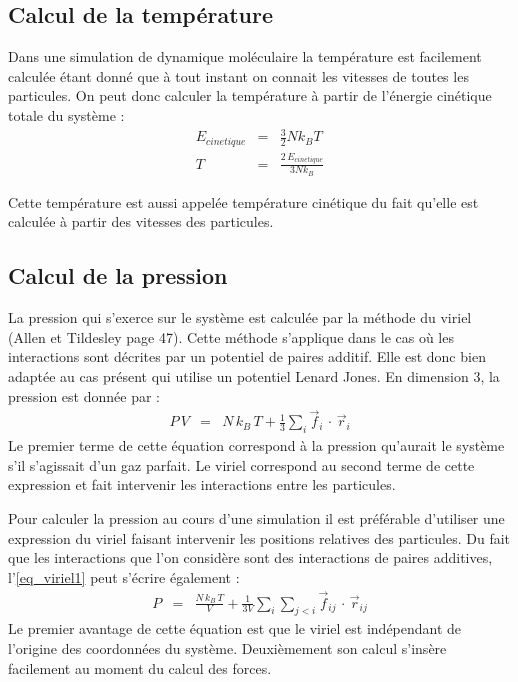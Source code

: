 \documentclass[11pt,a4paper,fleqn]{book}
\begin{document}
\subsection{Calcul de la température}

Dans une simulation de dynamique moléculaire la température est facilement
calculée étant donné que à tout instant on connait les vitesses de toutes 
les particules. On peut donc calculer la température à partir de l'énergie
cinétique totale du système :
%
\begin{eqnarray}
	E_{cinetique} & =  & \frac{3}{2}N k_B T \\
	T & = & \frac{2 \, E_{cinetique}}{3 N k_B}
\end{eqnarray}

Cette température est aussi appelée température cinétique du fait qu'elle
est calculée à partir des vitesses des particules.

\subsection{Calcul de la pression}

La pression qui s'exerce sur le système est calculée par la méthode du 
viriel (Allen et Tildesley page 47). Cette méthode s'applique dans le cas
où les interactions sont décrites par un potentiel de paires additif. Elle
est donc bien adaptée au cas présent qui utilise un potentiel Lenard Jones.
En dimension 3, la pression est donnée par :
%
\begin{eqnarray}\label{eq_viriel1}
	P\,V & = & N \, k_B \, T + \frac{1}{3}\sum_i \vec{f}_i \, \cdot \, \vec{r}_i
\end{eqnarray}
%
Le premier terme de cette équation correspond à la pression qu'aurait le
système s'il s'agissait d'un gaz parfait. Le viriel correspond au second 
terme de cette expression et fait intervenir les interactions entre
les particules.

Pour calculer la pression au cours d'une simulation il est préférable
d'utiliser une expression du viriel faisant intervenir les positions relatives des
particules. Du fait que les interactions que l'on considère sont des
interactions de paires additives, l'\ref{eq_viriel1} peut
s'écrire également :
%
\begin{eqnarray}\label{eq_viriel2}
	P & = & \frac{N \, k_B \, T}{V} + \frac{1}{3V}\sum_i \sum_{j<i} 
		\vec{f}_{ij} \, \cdot \, \vec{r}_{ij}
\end{eqnarray}
%
Le premier avantage de cette équation est que le viriel est
indépendant de l'origine des coordonnées du système. Deuxièmement
son calcul s'insère facilement au moment du calcul des forces.
\end{document}
